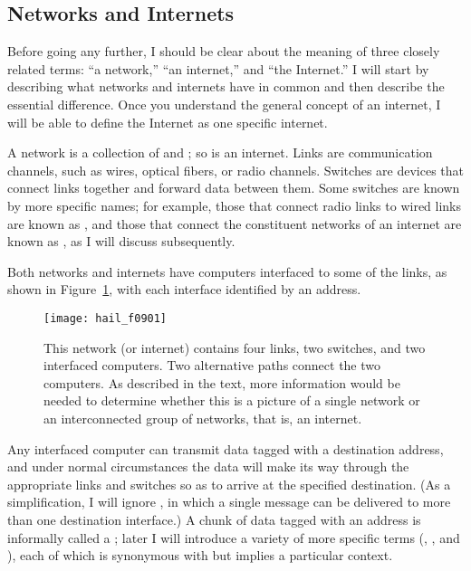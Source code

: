 \subsection{Networks and Internets}\label{networks-and-internets-section}

Before going any further, I should be clear about the meaning of three
closely related terms: ``a network,'' ``an internet,'' and ``the
Internet.''  I will start by describing what networks and internets
have in common and then describe the essential difference.  Once you
understand the general concept of an internet, I will be able to
define the Internet as one specific internet.

A network is a collection of 
and ; so is an internet.  Links are communication channels, such
as wires, optical fibers, or radio channels.  Switches are devices
that connect links together and forward data between them. Some switches are known by more
specific names; for example, those that connect radio links to wired
links are known as , and those that connect the
constituent networks of an internet are known as , as I
will discuss subsequently.

Both networks and internets have computers interfaced to some of the
links, as shown in Figure~\ref{scan-9-1}, with each
interface identified by an address.
\begin{figure}
\centerline{\texttt{[image: hail\_f0901]}}
\caption{This network (or internet) contains four links, two switches,
  and two interfaced computers.  Two alternative
  paths connect the two computers.  As described in the text, more
  information would be needed to determine whether this is a picture
  of a single network or an interconnected group of networks, that is, an
  internet.}
\label{scan-9-1}
\end{figure}
Any interfaced computer can
transmit data tagged with a destination address, and under normal
circumstances the data will make its way through the appropriate
links and switches so as to arrive at the specified
destination.  (As a simplification, I will ignore ,
in which a single message can be delivered to more than one
destination interface.)  A chunk of data tagged with an address is informally called a ; later I will introduce a variety of more specific terms (, , and ), each of which is synonymous with  but implies a particular context.

